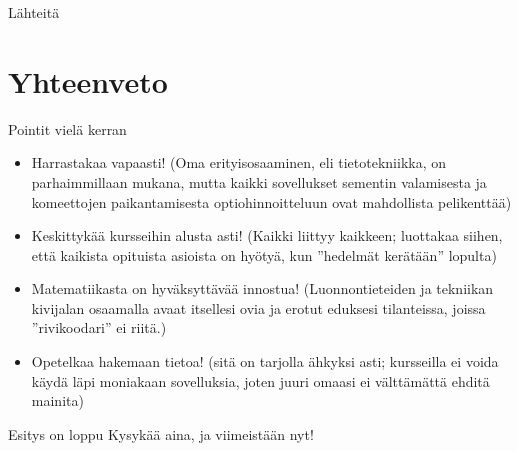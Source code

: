 \documentclass[pdf,10pt,handout]{beamer}
\begin{document}
\beamerdefaultoverlayspecification{}
\begin{frame}[allowframebreaks]{Lähteitä}

  \tiny
  
  

\end{frame}

\beamerdefaultoverlayspecification{<+->}

\section{Yhteenveto}
\begin{frame}{Pointit vielä kerran}
\begin{itemize}
\item Harrastakaa vapaasti! (Oma erityisosaaminen, eli tietotekniikka,
  on parhaimmillaan mukana, mutta kaikki sovellukset sementin
  valamisesta ja komeettojen paikantamisesta optiohinnoitteluun ovat
  mahdollista pelikenttää)
\item Keskittykää kursseihin alusta asti! (Kaikki liittyy kaikkeen;
  luottakaa siihen, että kaikista opituista asioista on hyötyä, kun
  ''hedelmät kerätään'' lopulta)
\item Matematiikasta on hyväksyttävää innostua! (Luonnontieteiden ja
  tekniikan kivijalan osaamalla avaat itsellesi ovia ja erotut
  eduksesi tilanteissa, joissa ''rivikoodari'' ei riitä.)
\item Opetelkaa hakemaan tietoa! (sitä on tarjolla ähkyksi asti;
  kursseilla ei voida käydä läpi moniakaan sovelluksia, joten juuri
  omaasi ei välttämättä ehditä mainita)
  
\end{itemize}
\end{frame}

\begin{frame}{Esitys on loppu}
  Kysykää aina, ja viimeistään nyt!
\end{frame}
\end{document}
